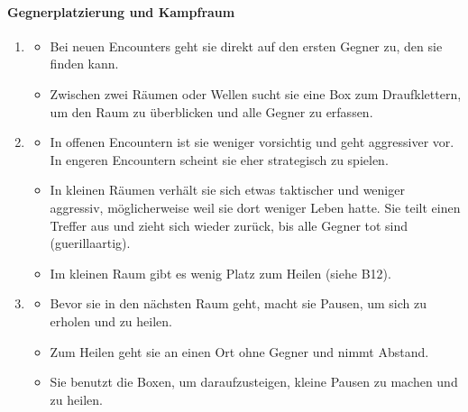 \documentclass[../Main.tex]{subfiles}
\begin{document}
\paragraph{Gegnerplatzierung und Kampfraum}
\begin{enumerate}[label=\textbf{B\arabic*}, leftmargin=1.5cm, itemsep=0.8em, resume]
    \item
        \begin{itemize}[nosep]
            \item Bei neuen Encounters geht sie direkt auf den ersten Gegner zu, den sie finden kann.
            \item Zwischen zwei Räumen oder Wellen sucht sie eine Box zum Draufklettern, um den Raum zu überblicken und alle Gegner zu erfassen.
        \end{itemize}

    \item
        \begin{itemize}[nosep]
            \item In offenen Encountern ist sie weniger vorsichtig und geht aggressiver vor. In engeren Encountern scheint sie eher strategisch zu spielen.
            \item In kleinen Räumen verhält sie sich etwas taktischer und weniger aggressiv, möglicherweise weil sie dort weniger Leben hatte. Sie teilt einen Treffer aus und zieht sich wieder zurück, bis alle Gegner tot sind (guerillaartig).
            \item Im kleinen Raum gibt es wenig Platz zum Heilen (siehe B12).
        \end{itemize}

    \item
        \begin{itemize}[nosep]
            \item Bevor sie in den nächsten Raum geht, macht sie Pausen, um sich zu erholen und zu heilen.
            \item Zum Heilen geht sie an einen Ort ohne Gegner und nimmt Abstand.
            \item Sie benutzt die Boxen, um daraufzusteigen, kleine Pausen zu machen und zu heilen.
        \end{itemize}


\end{enumerate}
\end{document}
